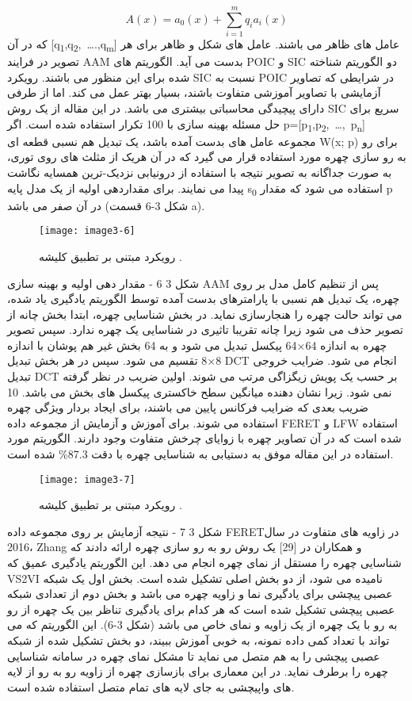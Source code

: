 \begin{equation}\label{eq3-2}
A(x)=a_0(x)+\sum_{i=1}^{m}{q_ia_i(x)}
\end{equation}
که در آن
[q\textsubscript{1},q\textsubscript{2},\ \ldots.,q\textsubscript{m}]
عامل های ظاهر می باشند. عامل های شکل و ظاهر برای هر تصویر در فرایند AAM بدست می آید. الگوریتم های POIC  و SIC  دو الگوریتم شناخته شده برای این منظور می باشند. رویکرد SIC نسبت به POIC در شرایطی که تصاویر آزمایشی با تصاویر آموزشی متفاوت باشند، بسیار بهتر عمل می کند. اما از طرفی دارای پیچیدگی محاسباتی بیشتری می باشد. در این مقاله از یک روش SIC سریع برای حل مسئله بهینه سازی با 100 تکرار استفاده شده است. اگر
p=[p\textsubscript{1},p\textsubscript{2},\ \ldots,\ p\textsubscript{n}]
مجموعه عامل های بدست آمده باشد، یک تبدیل هم نسبی قطعه ای  W(x; p) برای رو به رو سازی چهره مورد استفاده قرار می گیرد که در آن هریک از مثلث های روی توری، به صورت جداگانه به تصویر نتیجه با استفاده از درونیابی نزدیک-ترین همسایه  نگاشت پیدا می نمایند. برای مقداردهی اولیه از یک مدل پایه
s\textsubscript{0}
استفاده می شود که مقدار p در آن صفر می باشد (شکل 3-6 قسمت a). 
 \begin{figure}[h]
\centering
  \texttt{[image: image3-6]}
  \caption{رویکرد مبتنی بر تطبیق کلیشه  \cite{ref1}.}
  \label{image2-1}
\end{figure}
شکل ‏3 6 - مقدار دهی اولیه و بهینه سازی AAM
پس از تنظیم کامل مدل بر روی چهره، یک تبدیل هم نسبی با پارامترهای بدست آمده توسط الگوریتم یادگیری یاد شده، می تواند حالت چهره را هنجارسازی نماید. در بخش شناسایی چهره، ابتدا بخش چانه از تصویر حذف می شود زیرا چانه تقریبا تاثیری در شناسایی یک چهره ندارد. سپس تصویر چهره به اندازه 64×64 پیکسل تبدیل می شود و به 64 بخش غیر هم پوشان با اندازه 8×8 تقسیم می شود. سپس در هر بخش تبدیل DCT  انجام می شود. ضرایب خروجی تبدیل DCT بر حسب یک پویش زیگزاگی مرتب می شوند. اولین ضریب در نظر گرفته نمی شود. زیرا نشان دهنده میانگین سطح خاکستری پیکسل های بخش می باشد. 10 ضریب بعدی که ضرایب فرکانس پایین می باشند، برای ایجاد بردار ویژگی چهره استفاده می شوند. برای آموزش و آزمایش از مجموعه داده FERET و LFW استفاده شده است که در آن تصاویر چهره با زوایای چرخش متفاوت وجود دارند. الگوریتم مورد استفاده در این مقاله موفق به دستیابی به شناسایی چهره با دقت 87.3\% شده است.
 \begin{figure}[h]
\centering
  \texttt{[image: image3-7]}
  \caption{رویکرد مبتنی بر تطبیق کلیشه  \cite{ref1}.}
  \label{image2-1}
\end{figure}
شکل ‏3 7 - نتیجه آزمایش بر روی مجموعه داده  FERETدر زاویه های متفاوت
در سال 2016، Zhang و همکاران در [29] یک روش رو به رو سازی  چهره ارائه دادند که شناسایی چهره را مستقل از نمای چهره  انجام می دهد. این الگوریتم یادگیری عمیق که VS2VI نامیده می شود، از دو بخش اصلی تشکیل شده است. بخش اول یک شبکه عصبی پیچشی برای یادگیری نما و زاویه چهره می باشد و بخش دوم از تعدادی شبکه عصبی پیچشی تشکیل شده است که هر کدام برای یادگیری تناظر  بین یک چهره از رو به رو با یک چهره از یک زاویه و نمای خاص می باشد (شکل 3-6). این الگوریتم که می تواند با تعداد کمی داده نمونه، به خوبی آموزش ببیند، دو بخش تشکیل شده از شبکه عصبی پیچشی را به هم متصل می نماید تا مشکل نمای چهره در سامانه شناسایی چهره را برطرف نماید. در این معماری برای بازسازی چهره از زاویه رو به رو از لایه های واپیچشی  به جای لایه های تمام متصل استفاده شده است.
